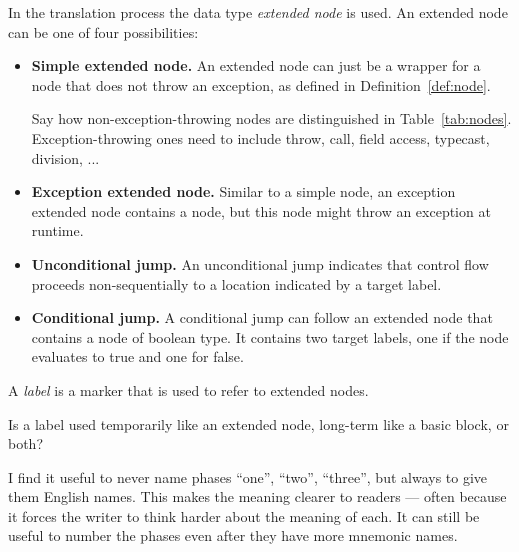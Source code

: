\begin{definition}
    In the translation process the data type \emph{extended node} is used.
    An extended node can be one of four possibilities:
    \begin{itemize}
        \item \textbf{Simple extended node.} An extended node can just be a
          wrapper for a node that does not throw an exception,
        as defined in Definition~\ref{def:node}.
        \begin{workinprogress}
          Say how non-exception-throwing nodes are distinguished in
          Table~\autoref{tab:nodes}.  Exception-throwing ones need to
          include throw, call, field access, typecast, division, ...
        \end{workinprogress}
        \item \textbf{Exception extended node.} Similar to a simple node, an exception extended
        node contains a node, but this node might throw an exception at runtime.
        \item \textbf{Unconditional jump.} An unconditional jump indicates that control
        flow proceeds non-sequentially to a location indicated by a target label.
        \item \textbf{Conditional jump.} A conditional jump can follow an extended node
        that contains a node of boolean type. It contains two target labels, one if the
        node evaluates to true and one for false.
    \end{itemize}
\end{definition}
\begin{definition}[Label]
    A \emph{label} is a marker that is used to refer to extended nodes.
\end{definition}

\begin{workinprogress}
Is a label used temporarily like an extended node, long-term like a basic
block, or both?
\end{workinprogress}

\begin{workinprogress}
I find it useful to never name phases ``one'', ``two'', ``three'', but
always to give them English names.  This makes the meaning clearer to
readers --- often because it forces the writer to think harder about the
meaning of each.  It can still be useful to number the phases even after
they have more mnemonic names.
\end{workinprogress}


